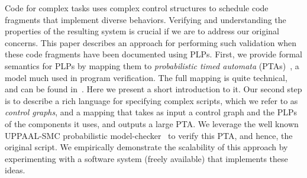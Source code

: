 \documentclass[letterpaper]{article}
\begin{document}
Code for complex tasks uses complex
control structures to schedule
code fragments that implement diverse behaviors.
Verifying and understanding the properties of the resulting system
is crucial if we are to address  our original concerns. This paper describes an
approach for performing such validation when these code fragments have been documented using PLPs.  First, we  provide formal semantics for PLPs by mapping them to \textit{probabilistic timed automata} (PTAs)~\citep{PTA}, a model much used in program verification. The full mapping is quite technical, and can be found in~\cite{kovalchu2018}. Here we present a short introduction to it.
Our second step is to describe a rich language for specifying complex scripts, which we refer to as {\em control graphs}, and a mapping that takes as input a control graph and the PLPs of the components it uses, and outputs a large PTA.
We leverage the well known
UPPAAL-SMC probabilistic model-checker~\cite{UPPAAL-SMC} to  verify this PTA,
and hence, the original script.
We empirically demonstrate the scalability of this approach by experimenting
with a software system (freely available) that implements these ideas.


\end{document}
